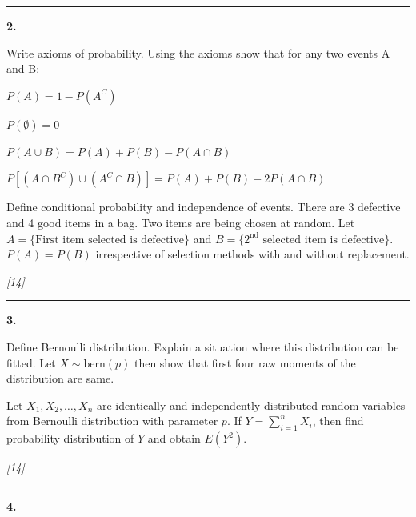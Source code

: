 \documentclass[11pt,a4paper]{article}
\newcommand{\pts}[1]{\hfill   \textit{[#1]}}
\begin{document}
\medskip\rule{\linewidth}{0.2pt}\medskip




\noindent   \textbf{2.}

\begin{parts}
  \item Write axioms of probability. Using the axioms show that for any two events A and B:
  
\begin{parts}
    \item $P(A) = 1 - P(A^C)$
    \item $P(\emptyset) = 0$
    \item $P(A \cup B) = P(A) + P(B) - P(A \cap B)$
    \item $P[(A \cap B^C) \cup (A^C \cap B)] = P(A) + P(B) - 2P(A \cap B)$
  \end{parts}
  \item Define conditional probability and independence of events. There are 3 defective and 4 good items in a bag. Two items are being chosen at random. Let $A = \{ \text{First item selected is defective}\}$ and $B = \{ \text{2}^{ \text{nd}} \text{ selected item is defective}\}$. $P(A) = P(B)$ irrespective of selection methods with and without replacement.
\end{parts}\pts{14}

\medskip\rule{\linewidth}{0.2pt}\medskip




\noindent   \textbf{3.}

\begin{parts}
  \item Define Bernoulli distribution. Explain a situation where this distribution can be fitted. Let $X \sim  \text{bern}(p)$ then show that first four raw moments of the distribution are same.
  \item Let $X_1, X_2, \dots, X_n$ are identically and independently distributed random variables from Bernoulli distribution with parameter $p$. If $Y = \sum_{i=1}^n X_i$, then find probability distribution of $Y$ and obtain $E(Y^2)$.
\end{parts}\pts{14}

\medskip\rule{\linewidth}{0.2pt}\medskip




\noindent   \textbf{4.}
\end{document}
